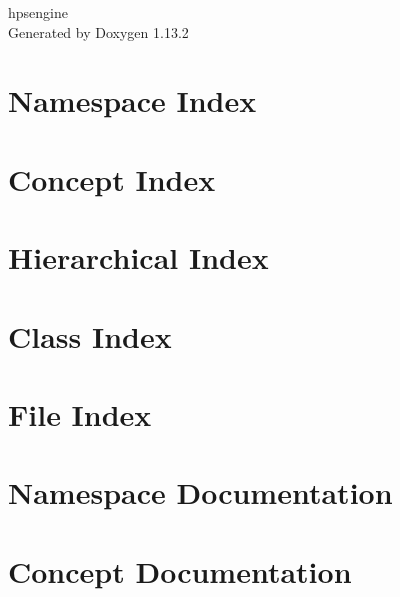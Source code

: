 \documentclass[twoside]{book}
\newcommand{\+}{\discretionary{\mbox{\scriptsize$\hookleftarrow$}}{}{}}
\newcommand{\clearemptydoublepage}{%
    \newpage{\pagestyle{empty}\cleardoublepage}%
  }
\begin{document}
  \raggedbottom
    \hypersetup{pageanchor=false,
                bookmarksnumbered=true,
                pdfencoding=unicode
               }
  \begin{titlepage}
  \vspace*{7cm}
  \begin{center}%
  {\Large hpsengine}\\
  \vspace*{1cm}
  {\large Generated by Doxygen 1.13.2}\\
  \end{center}
  \end{titlepage}
  \clearemptydoublepage
  \tableofcontents
  \clearemptydoublepage
  \hypersetup{pageanchor=true}
\chapter{Namespace Index}

\chapter{Concept Index}

\chapter{Hierarchical Index}

\chapter{Class Index}

\chapter{File Index}

\chapter{Namespace Documentation}





\chapter{Concept Documentation}

\end{document}
